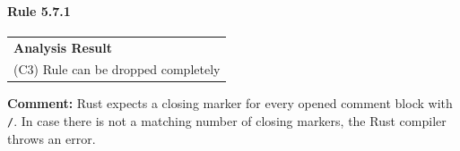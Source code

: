\paragraph{Rule 5.7.1}
\begin{longtable}{p{13cm}}
\textbf{Analysis Result} \\
(C3) Rule can be dropped completely \\
\end{longtable}
\textbf{Comment:} Rust expects a closing marker for every opened comment block with \texttt{/\*}. In case there is not a matching number of closing markers, the Rust compiler throws an error. \\


